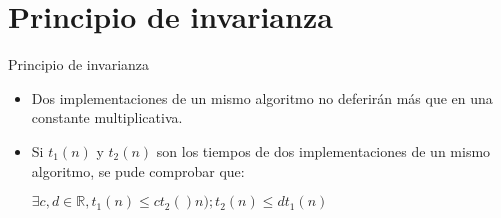 \section{Principio de invarianza}

\begin{frame}[c]{Principio de invarianza}
  \begin{itemize}
    \item Dos implementaciones de un mismo algoritmo no deferirán más
      que en una constante multiplicativa.
    \item Si $t_1(n)$ y $t_2(n)$ son los tiempos de dos implementaciones
      de un mismo algoritmo, se pude comprobar que:

      \vspace{\baselineskip}
      $\exists c,d \in \mathbb{R}, t_1(n) \leq ct_2()n); t_2(n) \leq dt_1(n)$
  \end{itemize}
\end{frame}
